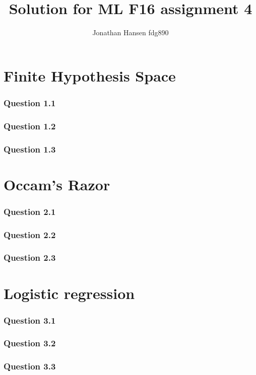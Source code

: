 \documentclass{article}
\begin{document}
\title{Solution for ML F16 assignment 4}
\author{Jonathan Hansen fdg890}
\maketitle

\section{Finite Hypothesis Space}

\subsubsection*{Question 1.1}

\subsubsection*{Question 1.2}

\subsubsection*{Question 1.3}


\section{Occam's Razor}

\subsubsection*{Question 2.1}

\subsubsection*{Question 2.2}

\subsubsection*{Question 2.3}

\section{Logistic regression}


\subsubsection*{Question 3.1}


\subsubsection*{Question 3.2}


\subsubsection*{Question 3.3}


\printbibliography
\end{document}
